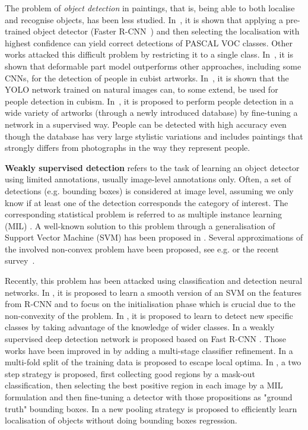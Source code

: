 \documentclass[runningheads]{llncs}
\begin{document}
The problem of {\it object detection} in paintings, that is, being able to both localise and recognise objects, has been less studied. In~\cite{crowley_art_2016}, it is shown that applying a pre-trained object detector (Faster R-CNN~\cite{ren_faster_2015}) and then selecting the localisation with highest confidence can yield correct detections of PASCAL VOC classes. Other works attacked this difficult problem by restricting it to a single class. In~\cite{ginosar2014detecting}, it is shown that deformable part model  outperforms other approaches, including some CNNs, for the detection of people in cubist artworks. In~\cite{redmon_you_2016}, it is shown that the YOLO network trained on natural images can, to some extend, be used for people detection in cubism.
In~\cite{westlake_detecting_2016}, it is proposed to perform people detection in a wide variety of artworks (through a newly introduced database) by fine-tuning a network in a supervised way. People can be detected with high accuracy even though the database has very large stylistic variations and includes paintings that strongly differs from photographs in the way they represent people. 


\textbf{Weakly supervised detection} refers to the task of learning an object detector using limited annotations, usually image-level annotations only. Often, a set of detections (e.g. bounding boxes) is considered at image level, assuming we only know if at least one of the detection corresponds the category of interest. The corresponding statistical problem is referred to as multiple instance learning (MIL) \cite{dietterich1997solving}. A well-known solution to this problem through a generalisation of Support Vector Machine (SVM) has been proposed in \cite{andrews_support_2003}. Several approximations of the involved non-convex problem have been proposed, see e.g. \cite{gehler2007deterministic} or the recent survey~\cite{carbonneau_multiple_2016}.

Recently, this problem has been attacked using classification and detection neural networks. In \cite{song_learning_2014}, it is proposed to learn a smooth version of an SVM  on the features from R-CNN \cite{girshick_rich_2014} and to focus on the initialisation phase which is crucial due to the non-convexity of the problem.
In \cite{redmon2016}, it is proposed to learn to detect new specific classes by taking advantage of the knowledge of wider classes. 
In \cite{bilen_weakly_2016} a weakly supervised deep detection network is proposed based on Fast R-CNN \cite{girshick_fast_2015}. Those works have been improved in \cite{tang_multiple_2017} by adding a multi-stage classifier refinement.
In \cite{cinbis_weakly_2016} a multi-fold split of the training data is proposed to escape local optima. 
In \cite{li_weakly_2016}, a two step strategy is proposed, first collecting good regions by a mask-out classification, then selecting the best positive region in each image by a MIL formulation and then fine-tuning a detector with those propositions as "ground truth" bounding boxes. 
In \cite{durand_wildcat_2017} a new pooling strategy is proposed to efficiently learn localisation of objects without doing bounding boxes regression.
\end{document}
